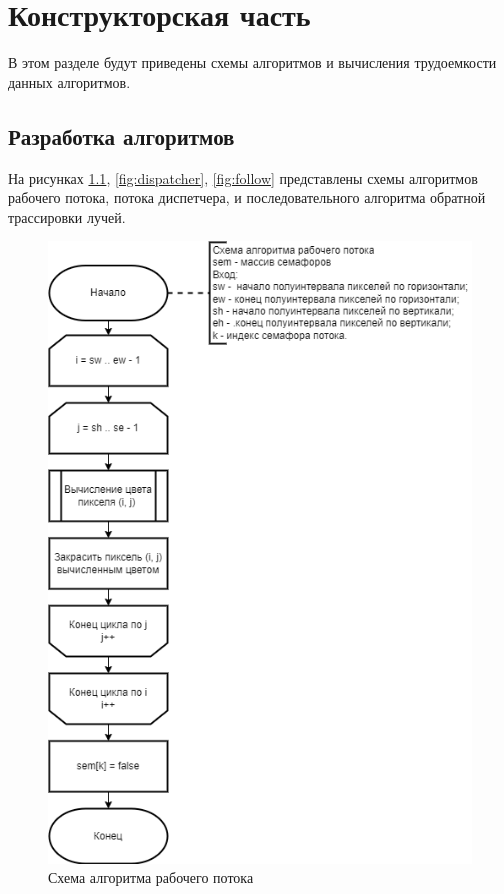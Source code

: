 \chapter{Конструкторская часть}
В этом разделе будут приведены схемы алгоритмов и вычисления трудоемкости данных алгоритмов.
\section{Разработка алгоритмов}

На рисунках \ref{fig:worker}, \ref{fig:dispatcher}, \ref{fig:follow} представлены схемы алгоритмов рабочего потока, потока диспетчера, и последовательного алгоритма обратной трассировки лучей.
\begin{figure}[H]
	\centering
	\includegraphics[width=0.7\linewidth]{inc/img/worker}
	\caption{Схема алгоритма рабочего потока}
	\label{fig:worker}
\end{figure}
